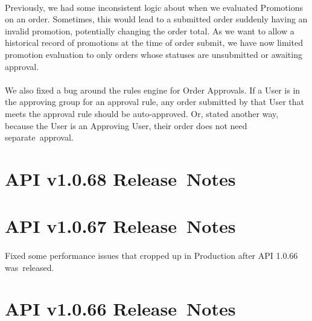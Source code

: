 \documentclass{memoir}%
\begin{document}
\paragraph*{}%

%
\paragraph*{}%
Previously, we had some inconsistent logic about when we evaluated Promotions on an order. Sometimes, this would lead to a submitted order suddenly having an invalid promotion, potentially changing the order total. \newline%
As we want to allow a historical record of promotions at the time of order submit, we have now limited promotion evaluation to only orders whose statuses are unsubmitted or awaiting approval.

%
\paragraph*{}%
We also fixed a bug around the rules engine for  Order Approvals. If a User is in the approving group for an approval rule, any order submitted by that User that meets the approval rule should be auto{-}approved. Or, stated another way, because the User is an Approving User, their order does not need separate~approval.

%
\section*{API v1.0.68 Release~Notes}%
\paragraph*{}%

%
\section*{API v1.0.67 Release~Notes}%
\paragraph*{}%

%
\paragraph*{}%
Fixed some performance issues that cropped up in Production after API 1.0.66 was~released.

%
\section*{API v1.0.66 Release~Notes}%
\end{document}
